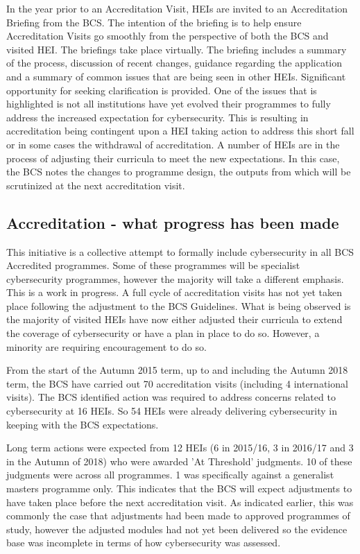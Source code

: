 \documentclass[conference]{IEEEtran}
\begin{document}
In the year prior to an Accreditation Visit, HEIs are invited to an Accreditation Briefing from the BCS. The intention of the briefing is to help ensure Accreditation Visits go smoothly from the perspective of both the BCS and visited HEI. The briefings take place virtually. The briefing includes a summary of the process, discussion of recent changes, guidance regarding the application and a summary of common issues that are being seen in other HEIs. Significant opportunity for seeking clarification is provided. One of the issues that is highlighted is not all institutions have yet evolved their programmes to fully address the increased expectation for cybersecurity. This is resulting in accreditation being contingent upon a HEI taking action to address this short fall or in some cases the withdrawal of accreditation. A number of HEIs are in the process of adjusting their curricula to meet the new expectations. In this case, the BCS notes the changes to programme design, the outputs from which will be scrutinized at the next accreditation visit.

\subsection{Accreditation - what progress has been made}

This initiative is a collective attempt to formally include cybersecurity in all BCS Accredited programmes. Some of these programmes will be specialist cybersecurity programmes, however the majority will take a different emphasis. This is a work in progress. A full cycle of accreditation visits has not yet taken place following the adjustment to the BCS Guidelines. What is being observed is the majority of visited HEIs have now either adjusted their curricula to extend the coverage of cybersecurity or have a plan in place to do so. However, a minority are requiring encouragement to do so.

From the start of the Autumn 2015 term, up to and including the Autumn 2018 term, the BCS have carried out 70 accreditation visits (including 4 international visits). The BCS identified action was required to address concerns related to cybersecurity at 16 HEIs. So 54 HEIs were already delivering cybersecurity in keeping with the BCS expectations.

Long term actions were expected from 12 HEIs (6 in 2015/16, 3 in 2016/17 and 3 in the Autumn of 2018) who were awarded 'At Threshold' judgments. 10 of these judgments were across all programmes. 1 was specifically against a generalist masters programme only. This indicates that the BCS will expect adjustments to have taken place before the next accreditation visit. As indicated earlier, this was commonly the case that adjustments had been made to approved programmes of study, however the adjusted modules had not yet been delivered so the evidence base was incomplete in terms of how cybersecurity was assessed.
 
\end{document}

